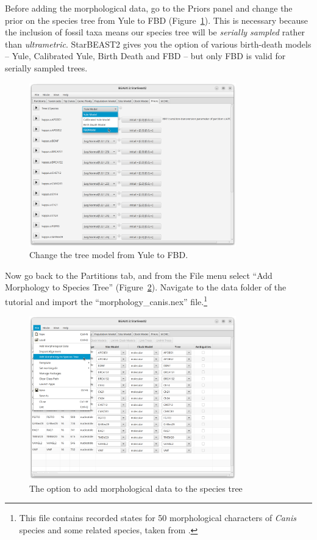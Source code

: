 \documentclass[12pt]{article}
\begin{document}
Before adding the morphological data, go to the Priors panel and change
the prior on the species tree from Yule to FBD
(Figure~\ref{fig:changeTreePrior}). This is necessary because the inclusion of
fossil taxa means our species tree will be \textit{serially sampled} rather
than \textit{ultrametric}. StarBEAST2 gives you the option of various
birth-death models -- Yule, Calibrated Yule, Birth Death and FBD -- but only
FBD is valid for serially sampled trees.

\begin{figure}[htb!]
\centering
\includegraphics[width=0.8\textwidth]{figures/changeTreePrior.png}
\caption
{Change the tree model from Yule to FBD.}
\label{fig:changeTreePrior}
\end{figure}

Now go back to the Partitions tab, and from the File menu select
``Add Morphology to Species Tree'' (Figure~\ref{fig:addMorphology}).
Navigate to the data folder of the tutorial and import the
``morphology\_canis.nex'' file.\footnote{This file contains recorded states for 50
morphological characters of \textit{Canis} species and some related species,
taken from \cite{Slater2015}.}

\begin{figure}[htb!]
\centering
\includegraphics[width=0.8\textwidth]{figures/addMorphology.png}
\caption
{The option to add morphological data to the species tree}
\label{fig:addMorphology}
\end{figure}
\end{document}
